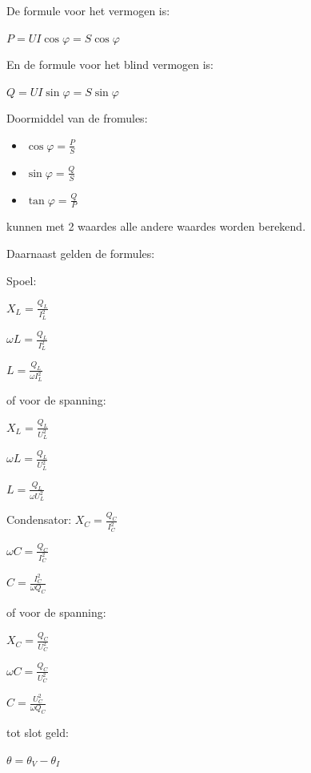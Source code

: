 De formule voor het vermogen is:

$P= UI \cos \varphi=S \cos \varphi$

\vspace{5mm}

En de formule voor het blind vermogen is:

$Q= UI \sin \varphi=S \sin \varphi$

\vspace{5mm}

Doormiddel van de fromules:
\begin{itemize}
    \item $\cos \varphi =\frac{P}{S}$
    \item $\sin \varphi =\frac{Q}{S}$
    \item $\tan \varphi =\frac{Q}{P}$
\end{itemize}

kunnen met 2 waardes alle andere waardes worden berekend.

Daarnaast gelden de formules:

Spoel:

$X_L=\frac{Q_L}{I_L^2}$

$\omega L=\frac{Q_L}{I_L^2}$

$L=\frac{Q_L}{\omega I_L^2}$

\vspace{5mm}

of voor de spanning:

$X_L=\frac{Q_L}{U_L^2}$

$\omega L=\frac{Q_L}{U_L^2}$

$L=\frac{Q_L}{\omega U_L^2}$

\vspace{5mm}

Condensator:
$X_C=\frac{Q_C}{I_C^2}$

$\omega C=\frac{Q_C}{I_C^2}$

$C=\frac{I_C^2}{\omega Q_C}$

\vspace{5mm}

of voor de spanning:

$X_C=\frac{Q_C}{U_C^2}$

$\omega C=\frac{Q_C}{U_C^2}$

$C=\frac{U_C^2}{\omega Q_C}$

tot slot geld: 

$\theta = \theta _V - \theta _I$
